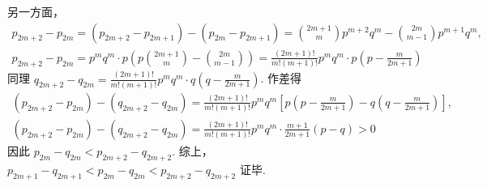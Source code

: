 \begin{solution}
\begin{enumerate}
另一方面，
\[
\begin{gathered}
p_{2m+2}-p_{2m}=(p_{2m+2}-p_{2m+1})-(p_{2m}-p_{2m+1})=\binom{2m+1}{m}p^{m+2}q^m-\binom{2m}{m-1}p^{m+1}q^m,\\
p_{2m+2}-p_{2m}=p^mq^m\cdot p\left(p\binom{2m+1}{m}-\binom{2m}{m-1}\right)=\frac{(2m+1)!}{m!(m+1)!}p^mq^m\cdot p\left(p-\frac{m}{2m+1}\right)
\end{gathered}
\]
同理
\(q_{2m+2}-q_{2m} =\frac{(2m+1)!}{m!(m+1)!}p^mq^m\cdot q\left(q-\frac{m}{2m+1}\right)\).
作差得
\[
\begin{gathered}
(p_{2m+2}-p_{2m})-(q_{2m+2}-q_{2m})=\frac{(2m+1)!}{m!(m+1)!}p^mq^m\left[p\left(p-\frac{m}{2m+1}\right)-q\left(q-\frac{m}{2m+1}\right)\right],\\
(p_{2m+2}-p_{2m})-(q_{2m+2}-q_{2m})=\frac{(2m+1)!}{m!(m+1)!}p^mq^m\cdot \frac{m+1}{2m+1}(p-q)>0
\end{gathered}
\]
因此
\(p_{2m}-q_{2m}<p_{2m+2}-q_{2m+2}\).
综上，
\(
p_{2m+1}-q_{2m+1}<p_{2m}-q_{2m}<p_{2m+2}-q_{2m+2}
\)
证毕.
\end{enumerate}
\end{solution}
